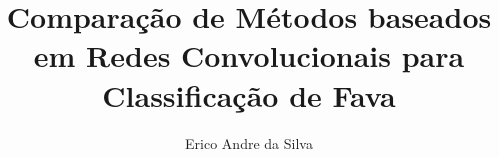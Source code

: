 \title{Comparação de Métodos baseados em Redes Convolucionais para Classificação de Fava}
\author{Erico Andre da Silva}
\address{Departamento de Estatística e Informática -- Universidade Federal Rural de Pernambuco\\ Rua Dom Manuel de Medeiros, s/n, - CEP: 52171-900  -- Recife -- PE -- Brasil
}
